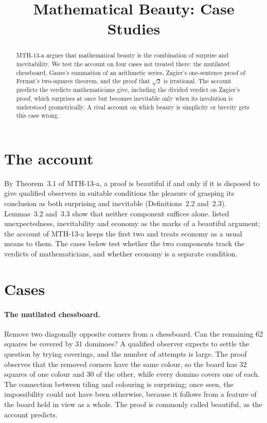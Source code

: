 \documentclass{situationist-preprint}
\title{Mathematical Beauty: Case Studies}
\begin{document}
\maketitle

\begin{abstract}
MTH-13-a argues that mathematical beauty is the combination of surprise and inevitability. We test the account on four cases not treated there: the mutilated chessboard, Gauss's summation of an arithmetic series, Zagier's one-sentence proof of Fermat's two-squares theorem, and the proof that $\sqrt{2}$ is irrational. The account predicts the verdicts mathematicians give, including the divided verdict on Zagier's proof, which surprises at once but becomes inevitable only when its involution is understood geometrically. A rival account on which beauty is simplicity or brevity gets this case wrong.
\end{abstract}

\section{The account}

By Theorem~3.1 of MTH-13-a, a proof is beautiful if and only if it is disposed to give qualified observers in suitable conditions the pleasure of grasping its conclusion as both surprising and inevitable (Definitions~2.2 and~2.3). Lemmas~3.2 and~3.3 show that neither component suffices alone. \citet{Hardy1940} listed unexpectedness, inevitability and economy as the marks of a beautiful argument; the account of MTH-13-a keeps the first two and treats economy as a usual means to them. The cases below test whether the two components track the verdicts of mathematicians, and whether economy is a separate condition.

\section{Cases}

\paragraph{The mutilated chessboard.} Remove two diagonally opposite corners from a chessboard. Can the remaining 62 squares be covered by 31 dominoes? A qualified observer expects to settle the question by trying coverings, and the number of attempts is large. The proof observes that the removed corners have the same colour, so the board has 32 squares of one colour and 30 of the other, while every domino covers one of each. The connection between tiling and colouring is surprising; once seen, the impossibility could not have been otherwise, because it follows from a feature of the board held in view as a whole. The proof is commonly called beautiful, as the account predicts.
\end{document}
